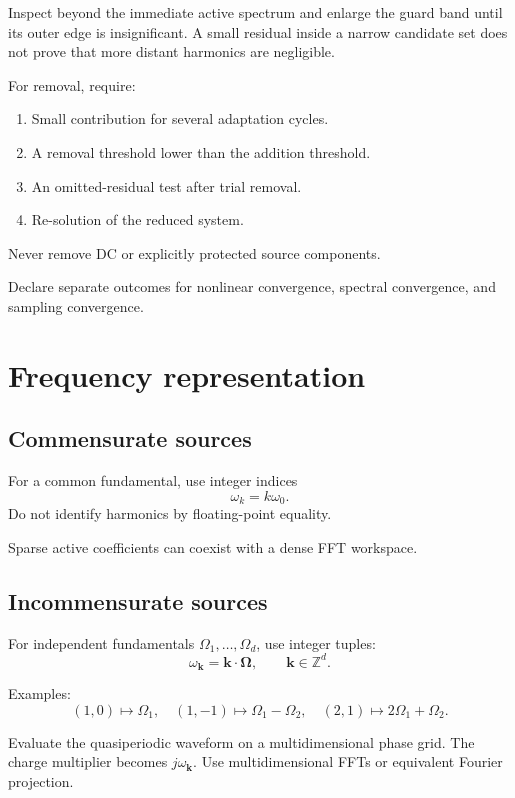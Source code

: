 \documentclass[11pt,a4paper]{article}
\begin{document}
Inspect beyond the immediate active spectrum and enlarge the guard band
until its outer edge is insignificant. A small residual inside a narrow
candidate set does not prove that more distant harmonics are negligible.

For removal, require:
\begin{enumerate}
 \item Small contribution for several adaptation cycles.
 \item A removal threshold lower than the addition threshold.
 \item An omitted-residual test after trial removal.
 \item Re-solution of the reduced system.
\end{enumerate}

Never remove DC or explicitly protected source components.

Declare separate outcomes for nonlinear convergence, spectral
convergence, and sampling convergence.

\section{Frequency representation}

\subsection{Commensurate sources}

For a common fundamental, use integer indices
\[
 \omega_k=k\omega_0.
\]
Do not identify harmonics by floating-point equality.

Sparse active coefficients can coexist with a dense FFT workspace.

\subsection{Incommensurate sources}

For independent fundamentals $\Omega_1,\ldots,\Omega_d$, use integer
tuples:
\[
 \omega_{\mathbf k}=\mathbf k\cdot\boldsymbol\Omega,
 \qquad \mathbf k\in\mathbb Z^d.
\]

Examples:
\[
 (1,0)\mapsto\Omega_1,\quad
 (1,-1)\mapsto\Omega_1-\Omega_2,\quad
 (2,1)\mapsto2\Omega_1+\Omega_2.
\]

Evaluate the quasiperiodic waveform on a multidimensional phase grid.
The charge multiplier becomes $j\omega_{\mathbf k}$.
Use multidimensional FFTs or equivalent Fourier projection.
\end{document}
